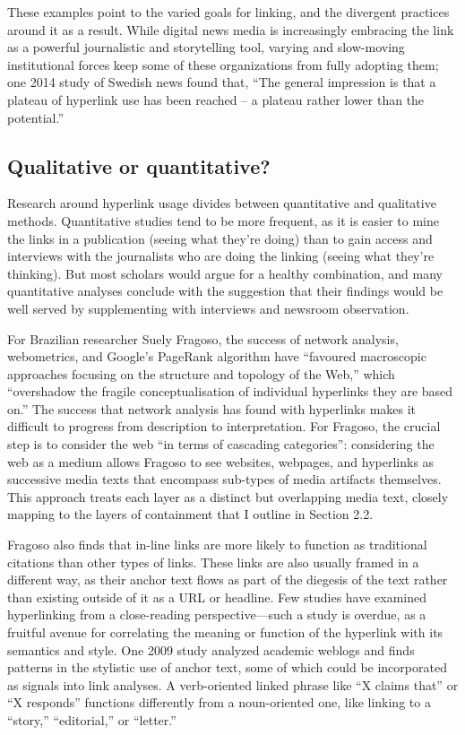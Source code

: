 These examples point to the varied goals for linking, and the divergent practices around it as a result. While digital news media is increasingly embracing the link as a powerful journalistic and storytelling tool, varying and slow-moving institutional forces keep some of these organizations from fully adopting them; one 2014 study of Swedish news found that, ``The general impression is that a plateau of hyperlink use has been reached -- a plateau rather lower than the potential.''\autocite[13]{karlsson_hyperlinking_2014}

\subsection{Qualitative or quantitative?}

Research around hyperlink usage divides between quantitative and qualitative methods. Quantitative studies tend to be more frequent, as it is easier to mine the links in a publication (seeing what they're doing) than to gain access and interviews with the journalists who are doing the linking (seeing what they're thinking). But most scholars would argue for a healthy combination, and many quantitative analyses conclude with the suggestion that their findings would be well served by supplementing with interviews and newsroom observation.

For Brazilian researcher Suely Fragoso, the success of network analysis, webometrics, and Google's PageRank algorithm have ``favoured macroscopic approaches focusing on the structure and topology of the Web,'' which ``overshadow the fragile conceptualisation of individual hyperlinks they are based on.''\autocite[164]{fragoso_understanding_2011} The success that network analysis has found with hyperlinks makes it difficult to progress from description to interpretation. For Fragoso, the crucial step is to consider the web ``in terms of cascading categories'': considering the web as a medium allows Fragoso to see websites, webpages, and hyperlinks as successive media texts that encompass sub-types of media artifacts themselves.\autocite[193]{fragoso_understanding_2011} This approach treats each layer as a distinct but overlapping media text, closely mapping to the layers of containment that I outline in Section 2.2.

Fragoso also finds that in-line links are more likely to function as traditional citations than other types of links. These links are also usually framed in a different way, as their anchor text flows as part of the diegesis of the text rather than existing outside of it as a URL or headline. Few studies have examined hyperlinking from a close-reading perspective---such a study is overdue, as a fruitful avenue for correlating the meaning or function of the hyperlink with its semantics and style. One 2009 study analyzed academic weblogs and finds patterns in the stylistic use of anchor text, some of which could be incorporated as signals into link analyses. A verb-oriented linked phrase like ``X claims that'' or ``X responds'' functions differently from a noun-oriented one, like linking to a ``story,'' ``editorial,'' or ``letter.''\autocite[80-85]{luzon_scholarly_2009}

